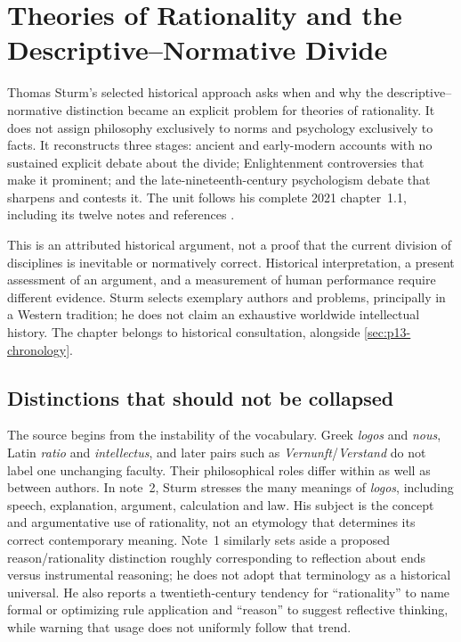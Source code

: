 \chapter{Theories of Rationality and the Descriptive--Normative Divide}
\label{sec:p13-rationality-1-1}

Thomas Sturm's selected historical approach asks when and why the
descriptive--normative distinction became an explicit problem for theories
of rationality. It does not assign philosophy exclusively to norms and
psychology exclusively to facts. It reconstructs three stages: ancient
and early-modern accounts with no sustained explicit debate about the
divide; Enlightenment controversies that make it prominent; and the
late-nineteenth-century psychologism debate that sharpens and contests
it. The unit follows his complete 2021 chapter~1.1, including its twelve
notes and references \parencite[pp.~71--86]{Sturm2021DescriptiveNormativeHistory}.

This is an attributed historical argument, not a proof that the current
division of disciplines is inevitable or normatively correct. Historical
interpretation, a present assessment of an argument, and a measurement of
human performance require different evidence. Sturm selects exemplary
authors and problems, principally in a Western tradition; he does not
claim an exhaustive worldwide intellectual history. The chapter belongs
to historical consultation, alongside \cref{sec:p13-chronology}.

\section{Distinctions that should not be collapsed}
\label{sec:p13-r11-distinctions}

The source begins from the instability of the vocabulary. Greek
\emph{logos} and \emph{nous}, Latin \emph{ratio} and \emph{intellectus},
and later pairs such as \emph{Vernunft}/\emph{Verstand} do not label one
unchanging faculty. Their philosophical roles differ within as well as
between authors. In note~2, Sturm stresses the many meanings of
\emph{logos}, including speech, explanation, argument, calculation and
law. His subject is the concept and argumentative use of rationality,
not an etymology that determines its correct contemporary meaning.
Note~1 similarly sets aside a proposed reason/rationality distinction
roughly corresponding to reflection about ends versus instrumental
reasoning; he does not adopt that terminology as a historical universal.
He also reports a twentieth-century tendency for ``rationality'' to name
formal or optimizing rule application and ``reason'' to suggest reflective
thinking, while warning that usage does not uniformly follow that trend.

